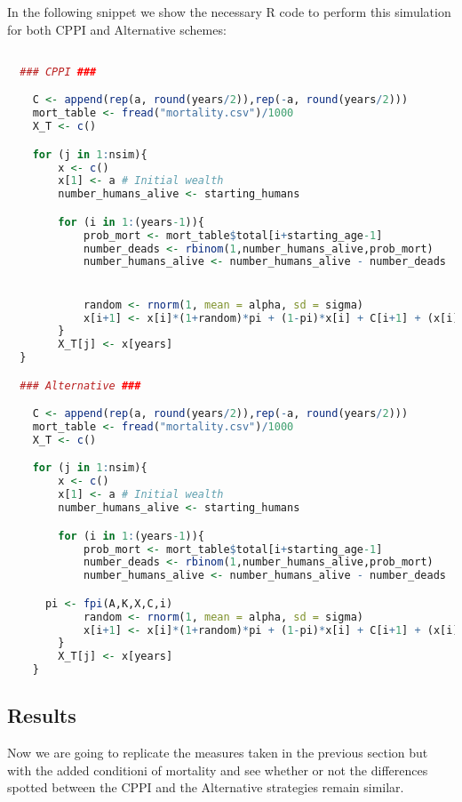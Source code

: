In the following snippet we show the necessary R code to perform this simulation for both CPPI and Alternative schemes:

\begin{lstlisting}[language = R]

  ### CPPI ###

	C <- append(rep(a, round(years/2)),rep(-a, round(years/2)))
	mort_table <- fread("mortality.csv")/1000
	X_T <- c()

	for (j in 1:nsim){
		x <- c()
		x[1] <- a # Initial wealth
		number_humans_alive <- starting_humans

		for (i in 1:(years-1)){
			prob_mort <- mort_table$total[i+starting_age-1]
			number_deads <- rbinom(1,number_humans_alive,prob_mort)
			number_humans_alive <- number_humans_alive - number_deads


			random <- rnorm(1, mean = alpha, sd = sigma)
			x[i+1] <- x[i]*(1+random)*pi + (1-pi)*x[i] + C[i+1] + (x[i]*number_deads/number_humans_alive)*w
		}
		X_T[j] <- x[years]
  }

  ### Alternative ###

	C <- append(rep(a, round(years/2)),rep(-a, round(years/2)))
	mort_table <- fread("mortality.csv")/1000
	X_T <- c()

	for (j in 1:nsim){
		x <- c()
		x[1] <- a # Initial wealth
		number_humans_alive <- starting_humans

		for (i in 1:(years-1)){
			prob_mort <- mort_table$total[i+starting_age-1]
			number_deads <- rbinom(1,number_humans_alive,prob_mort)
			number_humans_alive <- number_humans_alive - number_deads

      pi <- fpi(A,K,X,C,i)
			random <- rnorm(1, mean = alpha, sd = sigma)
			x[i+1] <- x[i]*(1+random)*pi + (1-pi)*x[i] + C[i+1] + (x[i]*number_deads/number_humans_alive)*w
		}
		X_T[j] <- x[years]
	}
\end{lstlisting}


\subsection{Results}

Now we are going to replicate the measures taken in the previous section but with the added conditioni of mortality and see whether or not the differences spotted between the CPPI and the Alternative strategies remain similar.

